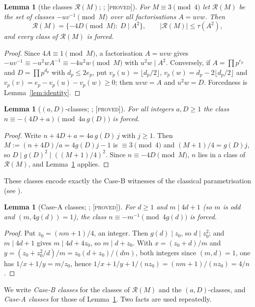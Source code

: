 \documentclass[10pt,reqno]{amsart}
\newtheorem{lemma}[theorem]{Lemma}
\theoremstyle{definition}
\theoremstyle{remark}
\newcommand{\cR}{\mathscr R}
\newcommand{\lab}[1]{\textup{[\textsc{#1}]}}
\begin{document}
\begin{lemma}[the classes $\cR(M)$; {\cite[Lemma~18.1]{Notes}}; \lab{proved}]\label{lem:RM}
For $M\equiv3\pmod4$ let $\cR(M)$ be the set of classes $-uv^{-1}\pmod M$
over all factorisations $A=uvw$.  Then
\[
 \cR(M)=\{-4D\pmod M:\ D\mid A^2\},\qquad
 |\cR(M)|\leq\tau(A^2),
\]
and every class of $\cR(M)$ is forced.
\end{lemma}
\begin{proof}
Since $4A\equiv1\pmod M$, a factorisation $A=uvw$ gives
$-uv^{-1}\equiv-u^2wA^{-1}\equiv-4u^2w\pmod M$ with $u^2w\mid A^2$.
Conversely, if $A=\prod p^{e_p}$ and $D=\prod p^{d_p}$ with $d_p\leq2e_p$, put
$v_p(u)=\lfloor d_p/2\rfloor$, $v_p(w)=d_p-2\lfloor d_p/2\rfloor$ and
$v_p(v)=e_p-v_p(u)-v_p(w)\geq0$; then $uvw=A$ and $u^2w=D$.  Forcedness is
Lemma~\ref{lem:identity}.
\end{proof}

\begin{lemma}[$(a,D)$-classes; {\cite[Lemma~3.2]{ET}}; \lab{proved}]\label{lem:aD}
For all integers $a,D\geq1$ the class $n\equiv-(4D+a)\pmod{4a\,g(D)}$ is
forced.
\end{lemma}
\begin{proof}
Write $n+4D+a=4a\,g(D)\,j$ with $j\geq1$.  Then $M:=(n+4D)/a=4g(D)j-1$ is
$\equiv3\pmod4$ and $(M+1)/4=g(D)j$, so $D\mid g(D)^2\mid((M+1)/4)^2$.
Since $n\equiv-4D\pmod M$, $n$ lies in a class of $\cR(M)$, and
Lemma~\ref{lem:RM} applies.
\end{proof}
These classes encode exactly the Case-B witnesses of the classical
parametrisation \cite[Thm~3.1(B)]{Notes} (see \cite[Lemma~3.2]{ET}).

\begin{lemma}[Case-A classes; {\cite[\S3]{ET}}; \lab{proved}]\label{lem:caseA}
For $d\geq1$ and $m\mid4d+1$ (so $m$ is odd and $(m,4g(d))=1$), the class
$n\equiv-m^{-1}\pmod{4g(d)}$ is forced.
\end{lemma}
\begin{proof}
Put $z_0=(nm+1)/4$, an integer.  Then $g(d)\mid z_0$, so $d\mid z_0^2$;
and $m\mid 4d+1$ gives $m\mid 4d+4z_0$, so $m\mid d+z_0$.  With
$x=(z_0+d)/m$ and $y=(z_0+z_0^2/d)/m=z_0(d+z_0)/(dm)$, both integers since
$(m,d)=1$, one has $1/x+1/y=m/z_0$, hence
$1/x+1/y+1/(nz_0)=(nm+1)/(nz_0)=4/n$.
\end{proof}

We write \emph{Case-B classes} for the classes of $\cR(M)$ and the
$(a,D)$-classes, and \emph{Case-A classes} for those of
Lemma~\ref{lem:caseA}.  Two facts are used repeatedly.
\end{document}
